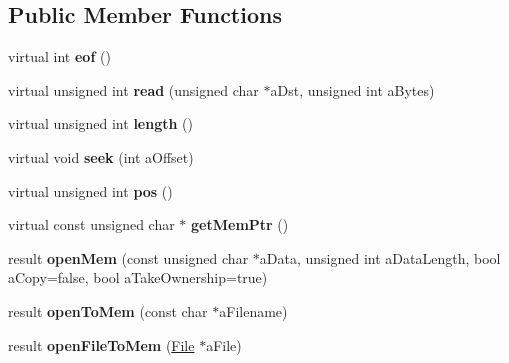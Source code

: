 \subsection*{Public Member Functions}
\begin{DoxyCompactItemize}
\item 
\mbox{\label{class_so_loud_1_1_memory_file_a02db5aa198bb6f8220bc6577bebe20b1}} 
virtual int {\bfseries eof} ()
\item 
\mbox{\label{class_so_loud_1_1_memory_file_ac8f30882f4a5bd0b6d1acb2e8c633507}} 
virtual unsigned int {\bfseries read} (unsigned char $\ast$a\+Dst, unsigned int a\+Bytes)
\item 
\mbox{\label{class_so_loud_1_1_memory_file_aadc6910b3055fde8433e3300be864013}} 
virtual unsigned int {\bfseries length} ()
\item 
\mbox{\label{class_so_loud_1_1_memory_file_af831e1efc00de45cd1a2dcfcce6b34d4}} 
virtual void {\bfseries seek} (int a\+Offset)
\item 
\mbox{\label{class_so_loud_1_1_memory_file_a6c89c883895980516c3cfa728576b4e6}} 
virtual unsigned int {\bfseries pos} ()
\item 
\mbox{\label{class_so_loud_1_1_memory_file_ae10c1c301415f3dd5673193d4e634ed4}} 
virtual const unsigned char $\ast$ {\bfseries get\+Mem\+Ptr} ()
\item 
\mbox{\label{class_so_loud_1_1_memory_file_a43aec8ef263b31879fe510170c16b8d3}} 
result {\bfseries open\+Mem} (const unsigned char $\ast$a\+Data, unsigned int a\+Data\+Length, bool a\+Copy=false, bool a\+Take\+Ownership=true)
\item 
\mbox{\label{class_so_loud_1_1_memory_file_ad5f92cd7d93255151b817169ec9ab9b6}} 
result {\bfseries open\+To\+Mem} (const char $\ast$a\+Filename)
\item 
\mbox{\label{class_so_loud_1_1_memory_file_a7cb55217fc03da894d3463f7577f45dd}} 
result {\bfseries open\+File\+To\+Mem} (\mbox{\hyperlink{class_so_loud_1_1_file}{File}} $\ast$a\+File)
\end{DoxyCompactItemize}
